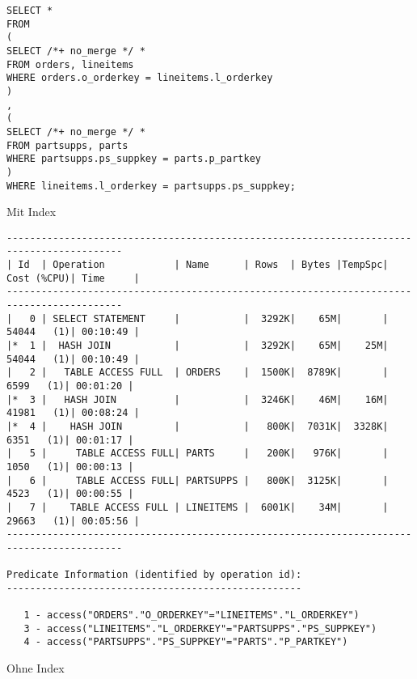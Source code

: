 \documentclass[10pt]{article}
\begin{document}
\begin{lstlisting}[style=sql]
SELECT *
FROM
(
SELECT /*+ no_merge */ *
FROM orders, lineitems
WHERE orders.o_orderkey = lineitems.l_orderkey
)
,
(
SELECT /*+ no_merge */ *
FROM partsupps, parts
WHERE partsupps.ps_suppkey = parts.p_partkey
)
WHERE lineitems.l_orderkey = partsupps.ps_suppkey;
\end{lstlisting}
Mit Index
\begin{lstlisting}[style=queryexecutionplan]
------------------------------------------------------------------------------------------
| Id  | Operation            | Name      | Rows  | Bytes |TempSpc| Cost (%CPU)| Time     |
------------------------------------------------------------------------------------------
|   0 | SELECT STATEMENT     |           |  3292K|    65M|       | 54044   (1)| 00:10:49 |
|*  1 |  HASH JOIN           |           |  3292K|    65M|    25M| 54044   (1)| 00:10:49 |
|   2 |   TABLE ACCESS FULL  | ORDERS    |  1500K|  8789K|       |  6599   (1)| 00:01:20 |
|*  3 |   HASH JOIN          |           |  3246K|    46M|    16M| 41981   (1)| 00:08:24 |
|*  4 |    HASH JOIN         |           |   800K|  7031K|  3328K|  6351   (1)| 00:01:17 |
|   5 |     TABLE ACCESS FULL| PARTS     |   200K|   976K|       |  1050   (1)| 00:00:13 |
|   6 |     TABLE ACCESS FULL| PARTSUPPS |   800K|  3125K|       |  4523   (1)| 00:00:55 |
|   7 |    TABLE ACCESS FULL | LINEITEMS |  6001K|    34M|       | 29663   (1)| 00:05:56 |
------------------------------------------------------------------------------------------
 
Predicate Information (identified by operation id):
---------------------------------------------------
 
   1 - access("ORDERS"."O_ORDERKEY"="LINEITEMS"."L_ORDERKEY")
   3 - access("LINEITEMS"."L_ORDERKEY"="PARTSUPPS"."PS_SUPPKEY")
   4 - access("PARTSUPPS"."PS_SUPPKEY"="PARTS"."P_PARTKEY")
\end{lstlisting}
Ohne Index
\end{document}
